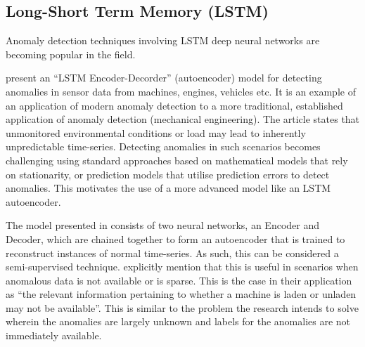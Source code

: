 \documentclass{mpaper}
\begin{document}

\subsection{Long-Short Term Memory (LSTM)}

Anomaly detection techniques involving LSTM deep neural networks are becoming popular in the field.

\cite{lstmEncoderDecorder} present an ``LSTM Encoder-Decorder'' (autoencoder) model for detecting anomalies in sensor data from machines, engines, vehicles etc. It is an example of an application of modern anomaly detection to a more traditional, established application of anomaly detection (mechanical engineering). The article states that unmonitored environmental conditions or load may lead to inherently unpredictable time-series. Detecting anomalies in such scenarios becomes challenging using standard approaches based on mathematical models that rely on stationarity, or prediction models that utilise prediction errors to detect anomalies. This motivates the use of a more advanced model like an LSTM autoencoder.

The model presented in \cite{lstmEncoderDecorder} consists of two neural networks, an Encoder and Decoder, which are chained together to form an autoencoder that is trained to reconstruct instances of normal time-series. As such, this can be considered a semi-supervised technique. \cite{lstmEncoderDecorder} explicitly mention that this is useful in scenarios when anomalous data is not available or is sparse. This is the case in their application as ``the relevant information pertaining to whether a machine is laden or unladen may not be available''. This is similar to the problem the research intends to solve wherein the anomalies are largely unknown and labels for the anomalies are not immediately available.
\end{document}
